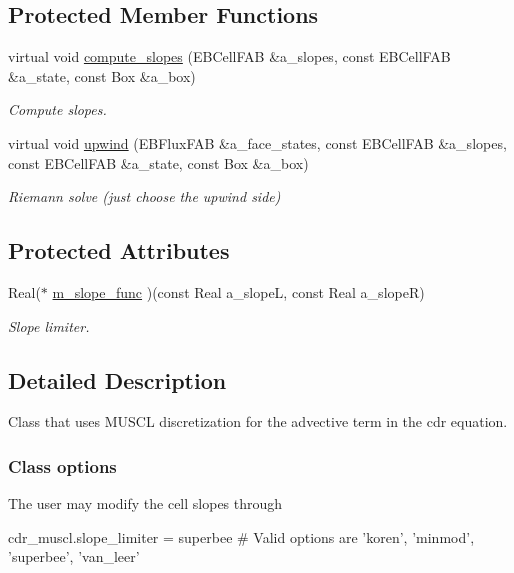 \subsection*{Protected Member Functions}
\begin{DoxyCompactItemize}
\item 
virtual void \hyperlink{classcdr__muscl_aced48f9ef1ea958fa163344e3c781e8d}{compute\+\_\+slopes} (E\+B\+Cell\+F\+AB \&a\+\_\+slopes, const E\+B\+Cell\+F\+AB \&a\+\_\+state, const Box \&a\+\_\+box)
\begin{DoxyCompactList}\small\item\em Compute slopes. \end{DoxyCompactList}\item 
virtual void \hyperlink{classcdr__muscl_aa10388207ac0374512a179e2ebe9d23f}{upwind} (E\+B\+Flux\+F\+AB \&a\+\_\+face\+\_\+states, const E\+B\+Cell\+F\+AB \&a\+\_\+slopes, const E\+B\+Cell\+F\+AB \&a\+\_\+state, const Box \&a\+\_\+box)
\begin{DoxyCompactList}\small\item\em Riemann solve (just choose the upwind side) \end{DoxyCompactList}\end{DoxyCompactItemize}
\subsection*{Protected Attributes}
\begin{DoxyCompactItemize}
\item 
Real($\ast$ \hyperlink{classcdr__muscl_a2f8dba855e3fa238b3d6e8f4d7ca3e92}{m\+\_\+slope\+\_\+func} )(const Real a\+\_\+slopeL, const Real a\+\_\+slopeR)
\begin{DoxyCompactList}\small\item\em Slope limiter. \end{DoxyCompactList}\end{DoxyCompactItemize}


\subsection{Detailed Description}
Class that uses M\+U\+S\+CL discretization for the advective term in the cdr equation. 

\subsubsection*{Class options }

The user may modify the cell slopes through \begin{DoxyVerb}cdr_muscl.slope_limiter = superbee     # Valid options are 'koren', 'minmod', 'superbee', 'van_leer'\end{DoxyVerb}
 


